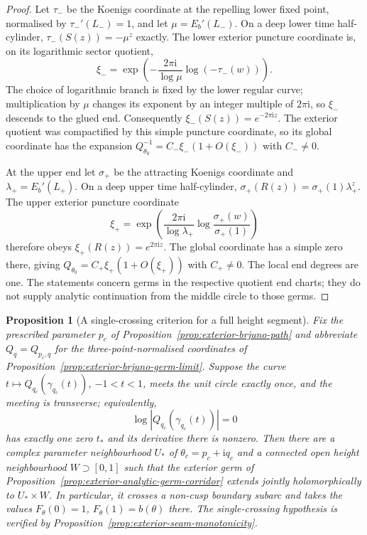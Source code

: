\documentclass[11pt]{amsart}
\newtheorem{proposition}[theorem]{Proposition}
\theoremstyle{definition}
\newcommand{\Rr}{R}
\newcommand{\ii}{\mathrm{i}}
\begin{document}
\begin{proof}
Let $\tau_-$ be the Koenigs coordinate at the repelling lower fixed
point, normalised by $\tau_-'(L_-)=1$, and let
$\mu=E_b'(L_-)$.  On a deep lower time half-cylinder,
$\tau_-(S(z))=-\mu^z$ exactly.  The lower exterior puncture
coordinate is, on its logarithmic sector quotient,
\[
 \xi_-=
 \exp\!\left(-\frac{2\pi\ii}{\log\mu}
                      \log(-\tau_-(w))\right).
\]
The choice of logarithmic branch is fixed by the lower regular
curve; multiplication by $\mu$ changes its exponent by an integer
multiple of $2\pi\ii$, so $\xi_-$ descends to the glued end.
Consequently $\xi_-(S(z))=e^{-2\pi\ii z}$.
The exterior quotient was compactified by this simple puncture
coordinate, so its global coordinate has the expansion
$Q_{\theta_0}^{-1}=C_-\xi_-(1+O(\xi_-))$ with $C_-\ne0$.

At the upper end let $\sigma_+$ be the attracting Koenigs
coordinate and $\lambda_+=E_b'(L_+)$.  On a deep upper time
half-cylinder,
$\sigma_+(\Rr(z))=\sigma_+(1)\lambda_+^z$.
The upper exterior puncture coordinate
\[
 \xi_+=\exp\!\left(\frac{2\pi\ii}{\log\lambda_+}
           \log\frac{\sigma_+(w)}{\sigma_+(1)}\right)
\]
therefore obeys $\xi_+(\Rr(z))=e^{2\pi\ii z}$.
The global coordinate has a simple zero there, giving
$Q_{\theta_0}=C_+\xi_+(1+O(\xi_+))$ with $C_+\ne0$.
The local end degrees are one.  The statements concern germs in
the respective quotient end charts; they do not supply analytic
continuation from the middle circle to those germs.
\end{proof}

\begin{proposition}[A single-crossing criterion for a full height segment]
\label{prop:exterior-single-crossing}
Fix the prescribed parameter $p_c$ of
Proposition~\ref{prop:exterior-brjuno-path} and abbreviate
$Q_q=Q_{p_c,q}$ for the three-point-normalised coordinates of
Proposition~\ref{prop:exterior-brjuno-germ-limit}.  Suppose the curve
$t\mapsto Q_{q_c}(\gamma_{q_c}(t))$, $-1<t<1$, meets the unit circle
exactly once, and the meeting is transverse; equivalently,
\[
 \log|Q_{q_c}(\gamma_{q_c}(t))|=0
\]
has exactly one zero $t_*$ and its derivative there is nonzero.
Then there are a complex parameter neighbourhood $U_*$ of
$\theta_c=p_c+\ii q_c$ and a connected open height neighbourhood
$W\supset[0,1]$ such that the exterior germ of
Proposition~\ref{prop:exterior-analytic-germ-corridor} extends
jointly holomorphically to $U_*\times W$.  In particular, it
crosses a non-cusp boundary subarc and takes the values
$F_\theta(0)=1$, $F_\theta(1)=b(\theta)$ there.  The
single-crossing hypothesis is verified by
Proposition~\ref{prop:exterior-seam-monotonicity}.
\end{proposition}
\end{document}
